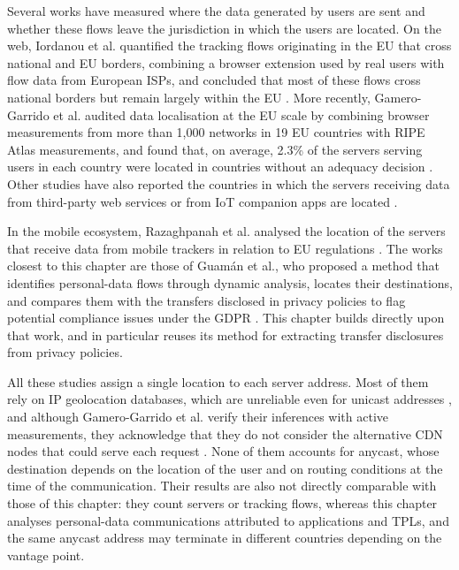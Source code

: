 Several works have measured where the data generated by users are sent and whether these flows leave the jurisdiction in which the users are located. On the web, Iordanou et al. quantified the tracking flows originating in the EU that cross national and EU borders, combining a browser extension used by real users with flow data from European ISPs, and concluded that most of these flows cross national borders but remain largely within the EU \cite{Iordanou2018TracingTracking}. More recently, Gamero-Garrido et al. audited data localisation at the EU scale by combining browser measurements from more than 1,000 networks in 19 EU countries with RIPE Atlas measurements, and found that, on average, 2.3\% of the servers serving users in each country were located in countries without an adequacy decision \cite{Gamero-Garrido2025EmpiricallyEU}. Other studies have also reported the countries in which the servers receiving data from third-party web services or from IoT companion apps are located \cite{Urban2020BeyondField, NanAreApps}.

In the mobile ecosystem, Razaghpanah et al. analysed the location of the servers that receive data from mobile trackers in relation to EU regulations \cite{Razaghpanah2018AppsEcosystem}. The works closest to this chapter are those of Guamán et al., who proposed a method that identifies personal-data flows through dynamic analysis, locates their destinations, and compares them with the transfers disclosed in privacy policies to flag potential compliance issues under the GDPR \cite{Guaman2021GDPRApps, Guaman2023AutomatedApplications}. This chapter builds directly upon that work, and in particular reuses its method for extracting transfer disclosures from privacy policies.

All these studies assign a single location to each server address. Most of them rely on IP geolocation databases, which are unreliable even for unicast addresses \cite{Cozar2022ReliabilityTransfers}, and although Gamero-Garrido et al. verify their inferences with active measurements, they acknowledge that they do not consider the alternative CDN nodes that could serve each request \cite{Gamero-Garrido2025EmpiricallyEU}. None of them accounts for anycast, whose destination depends on the location of the user and on routing conditions at the time of the communication. Their results are also not directly comparable with those of this chapter: they count servers or tracking flows, whereas this chapter analyses personal-data communications attributed to applications and TPLs, and the same anycast address may terminate in different countries depending on the vantage point.

